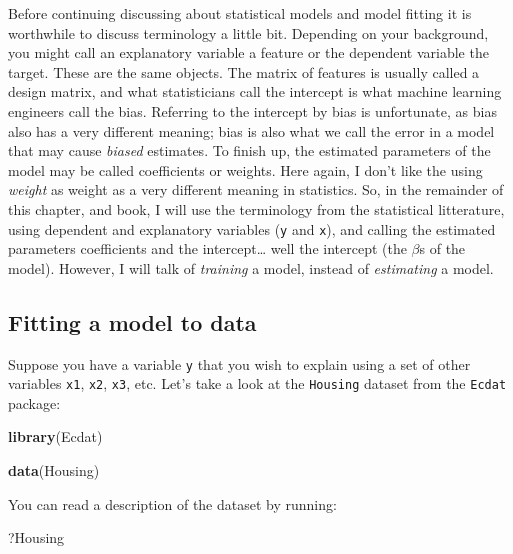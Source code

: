 \documentclass[
]{article}
\newenvironment{Shaded}{\begin{snugshade}}{\end{snugshade}}
\newcommand{\KeywordTok}[1]{\textcolor[rgb]{0.13,0.29,0.53}{\textbf{#1}}}
\newcommand{\NormalTok}[1]{#1}
\begin{document}
Before continuing discussing about statistical models and model fitting it is worthwhile to discuss
terminology a little bit. Depending on your background, you might call an explanatory variable a
feature or the dependent variable the target. These are the same objects. The matrix of features
is usually called a design matrix, and what statisticians call the intercept is what
machine learning engineers call the bias. Referring to the intercept by bias is unfortunate, as bias
also has a very different meaning; bias is also what we call the error in a model that may cause
\emph{biased} estimates. To finish up, the estimated parameters of the model may be called coefficients
or weights. Here again, I don't like the using \emph{weight} as weight as a very different meaning in
statistics.
So, in the remainder of this chapter, and book, I will use the terminology from the statistical
litterature, using dependent and explanatory variables (\texttt{y} and \texttt{x}), and calling the
estimated parameters coefficients and the intercept\ldots{} well the intercept (the \(\beta\)s of the model).
However, I will talk of \emph{training} a model, instead of \emph{estimating} a model.

\hypertarget{fitting-a-model-to-data}{%
\subsection{Fitting a model to data}\label{fitting-a-model-to-data}}

Suppose you have a variable \texttt{y} that you wish to explain using a set of other variables \texttt{x1}, \texttt{x2},
\texttt{x3}, etc. Let's take a look at the \texttt{Housing} dataset from the \texttt{Ecdat} package:

\begin{Shaded}
\begin{Highlighting}[]
\KeywordTok{library}\NormalTok{(Ecdat)}

\KeywordTok{data}\NormalTok{(Housing)}
\end{Highlighting}
\end{Shaded}

You can read a description of the dataset by running:

\begin{Shaded}
\begin{Highlighting}[]
\NormalTok{?Housing}
\end{Highlighting}
\end{Shaded}
\end{document}
